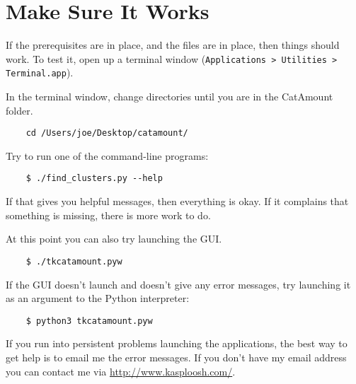\section{Make Sure It Works}

If the prerequisites are in place, and the files are in place, then things
should work. To test it, open up a terminal window (\verb=Applications > Utilities > Terminal.app=).

In the terminal window, change directories until you are in the CatAmount
folder.

\begin{verbatim}
    cd /Users/joe/Desktop/catamount/
\end{verbatim}

Try to run one of the command-line programs:

\begin{verbatim}
    $ ./find_clusters.py --help
\end{verbatim}

If that gives you helpful messages, then everything is okay. If it complains
that something is missing, there is more work to do.

At this point you can also try launching the GUI.

\begin{verbatim}
    $ ./tkcatamount.pyw
\end{verbatim}

If the GUI doesn't launch and doesn't give any error messages, try launching
it as an argument to the Python interpreter:

\begin{verbatim}
    $ python3 tkcatamount.pyw
\end{verbatim}

If you run into persistent problems launching the applications, the best way
to get help is to email me the error messages. If you don't have my email address
you can contact me via \url{http://www.kasploosh.com/}.
